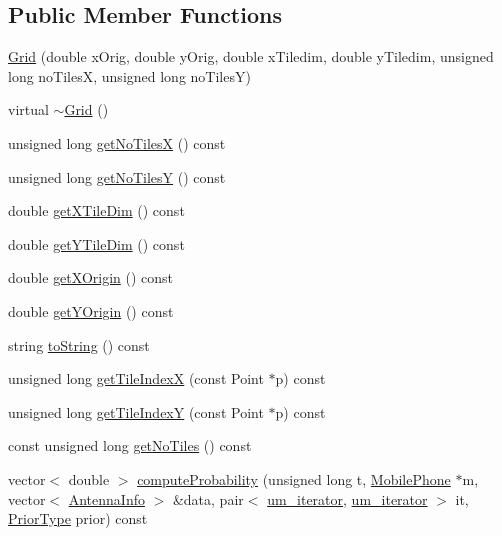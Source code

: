 \subsection*{Public Member Functions}
\begin{DoxyCompactItemize}
\item 
\hyperlink{class_grid_a84b0dc169028f21175a4549afde86153}{Grid} (double x\+Orig, double y\+Orig, double x\+Tiledim, double y\+Tiledim, unsigned long no\+TilesX, unsigned long no\+TilesY)
\item 
virtual \hyperlink{class_grid_a241c623291936ddbf4f670a796523a91}{$\sim$\+Grid} ()
\item 
unsigned long \hyperlink{class_grid_af29c0c404a908aa46f83afb17d7609a6}{get\+No\+TilesX} () const
\item 
unsigned long \hyperlink{class_grid_a783a3153d03154cfd33e6a418bb8d390}{get\+No\+TilesY} () const
\item 
double \hyperlink{class_grid_a1c5b9ad91fac264bcdd67f99bc93f663}{get\+X\+Tile\+Dim} () const
\item 
double \hyperlink{class_grid_aedfe477f5be79a375bd64a4d21765918}{get\+Y\+Tile\+Dim} () const
\item 
double \hyperlink{class_grid_a08b534c7f8e1099a6903bf08d9727842}{get\+X\+Origin} () const
\item 
double \hyperlink{class_grid_a53141770920cf261579cf164a8909af9}{get\+Y\+Origin} () const
\item 
string \hyperlink{class_grid_ad48d195b5e333a94a3a14d6395252b2a}{to\+String} () const
\item 
unsigned long \hyperlink{class_grid_af4094832e2adedbbd47889973f5a40da}{get\+Tile\+IndexX} (const Point $\ast$p) const
\item 
unsigned long \hyperlink{class_grid_ae1eeb3b42007ae1cf19cfaf0d846fb9a}{get\+Tile\+IndexY} (const Point $\ast$p) const
\item 
const unsigned long \hyperlink{class_grid_ab0a71c762b6c33e6fa2fd49dde38228b}{get\+No\+Tiles} () const
\item 
vector$<$ double $>$ \hyperlink{class_grid_a15b32bc4e110b63b3506cd932afa5e2a}{compute\+Probability} (unsigned long t, \hyperlink{class_mobile_phone}{Mobile\+Phone} $\ast$m, vector$<$ \hyperlink{class_antenna_info}{Antenna\+Info} $>$ \&data, pair$<$ \hyperlink{_agents_collection_8h_afde47bc45d604b8b8c72755072376679}{um\+\_\+iterator}, \hyperlink{_agents_collection_8h_afde47bc45d604b8b8c72755072376679}{um\+\_\+iterator} $>$ it, \hyperlink{_prior_type_8h_a61286c562e68de246982fc393a7c23a5}{Prior\+Type} prior) const

\end{DoxyCompactItemize}
